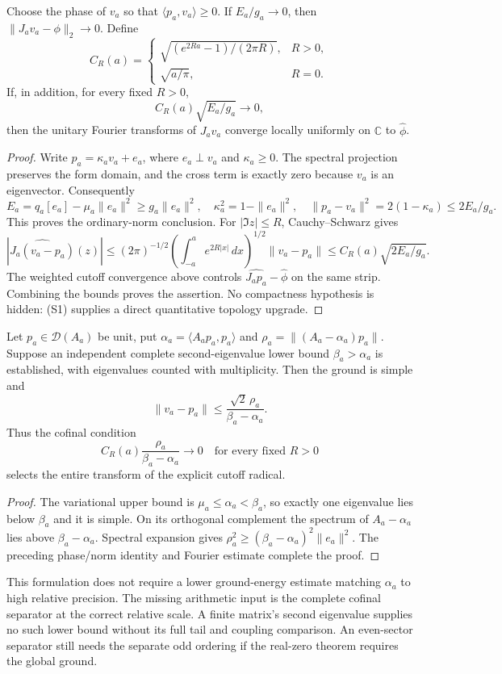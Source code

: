 \begin{proposition}
\label{prop:ns43-ccm-rayleigh-selection}
Choose the phase of $v_a$ so that $\langle p_a,v_a\rangle\ge0$.
If $E_a/g_a\to0$, then $\|J_av_a-\phi\|_2\to0$.
Define
\[
 C_R(a)=\begin{cases}
 \sqrt{(e^{2Ra}-1)/(2\pi R)},&R>0,\\
 \sqrt{a/\pi},&R=0.
 \end{cases}
\]
If, in addition, for every fixed $R>0$,
\[
 C_R(a)\sqrt{E_a/g_a}\longrightarrow0,
 \tag{S1}
\]
then the unitary Fourier transforms of $J_av_a$ converge locally
uniformly on $\mathbb C$ to $\widehat\phi$.
\end{proposition}
\begin{proof}
Write $p_a=\kappa_a v_a+e_a$, where $e_a\perp v_a$ and
$\kappa_a\ge0$. The spectral projection preserves the form domain,
and the cross term is exactly zero because $v_a$ is an eigenvector.
Consequently
\[
 E_a=q_a[e_a]-\mu_a\|e_a\|^2\ge g_a\|e_a\|^2,
 \quad \kappa_a^2=1-\|e_a\|^2,
 \quad \|p_a-v_a\|^2=2(1-\kappa_a)\le2E_a/g_a.
\]
This proves the ordinary-norm conclusion. For $|\Im z|\le R$,
Cauchy--Schwarz gives
\[
 |\widehat{J_a(v_a-p_a)}(z)|
 \le (2\pi)^{-1/2}\left(\int_{-a}^a e^{2R|x|}\,dx\right)^{1/2}
       \|v_a-p_a\|
 \le C_R(a)\sqrt{2E_a/g_a}.
\]
The weighted cutoff convergence above controls
$\widehat{J_ap_a}-\widehat\phi$ on the same strip. Combining the
bounds proves the assertion. No compactness hypothesis is hidden:
(S1) supplies a direct quantitative topology upgrade.
\end{proof}

\begin{proposition}
\label{prop:ns43-ccm-residual-selection}
Let $p_a\in\mathcal D(A_a)$ be unit, put
$\alpha_a=\langle A_ap_a,p_a\rangle$ and
$\rho_a=\|(A_a-\alpha_a)p_a\|$. Suppose an independent complete
second-eigenvalue lower bound $\beta_a>\alpha_a$ is established,
with eigenvalues counted with multiplicity. Then the ground is simple and
\[
 \|v_a-p_a\|\le\frac{\sqrt2\,\rho_a}{\beta_a-\alpha_a}.
\]
Thus the cofinal condition
\[
 C_R(a)\frac{\rho_a}{\beta_a-\alpha_a}\longrightarrow0
 \quad\text{for every fixed }R>0 \tag{S1r}
\]
selects the entire transform of the explicit cutoff radical.
\end{proposition}
\begin{proof}
The variational upper bound is $\mu_a\le\alpha_a<\beta_a$, so
exactly one eigenvalue lies below $\beta_a$ and it is simple.
On its orthogonal complement the spectrum of $A_a-\alpha_a$ lies
above $\beta_a-\alpha_a$. Spectral expansion gives
$\rho_a^2\ge(\beta_a-\alpha_a)^2\|e_a\|^2$.
The preceding phase/norm identity and Fourier estimate complete the proof.
\end{proof}
This formulation does not require a lower ground-energy estimate matching
$\alpha_a$ to high relative precision. The missing arithmetic input is
the complete cofinal separator at the correct relative scale. A finite
matrix's second eigenvalue supplies no such lower bound without its full
tail and coupling comparison. An even-sector separator still needs the
separate odd ordering if the real-zero theorem requires the global ground.

